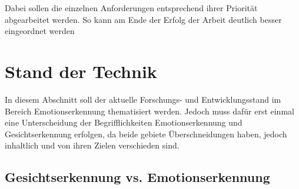\documentclass[12pt, a4paper]{scrbook}
\begin{document}
Dabei sollen die einzelnen Anforderungen entsprechend ihrer Priorität abgearbeitet werden. So kann am Ende der Erfolg der Arbeit deutlich besser eingeordnet werden

\let\cleardoublepage\relax

\chapter{Stand der Technik}
In diesem Abschnitt soll der aktuelle Forschungs- und Entwicklungsstand im Bereich Emotionserkennung thematisiert werden. Jedoch muss dafür erst einmal eine Unterscheidung der Begrifflichkeiten
Emotionserkennung und Gesichtserkennung erfolgen, da beide gebiete Überschneidungen haben, jedoch inhaltlich und von ihren Zielen verschieden sind.

\section{Gesichtserkennung vs. Emotionserkennung}
\end{document}
